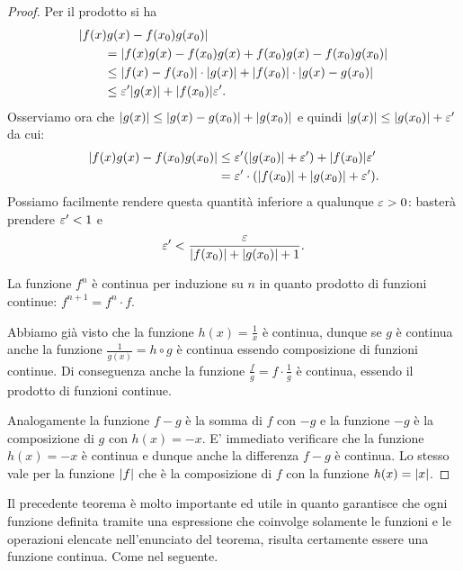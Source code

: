 \begin{proof}
  Per il prodotto si ha
  \begin{align*}
    \MoveEqLeft \abs{f(x)g(x)-f(x_0)g(x_0)}\\
    &= \abs{f(x)g(x) - f(x_0)g(x) + f(x_0)g(x) - f(x_0)g(x_0)}\\
    &\le \abs{f(x)-f(x_0)}\cdot\abs{g(x)} + \abs{f(x_0)}\cdot \abs{g(x)-g(x_0)} \\
    &\le \eps' \abs{g(x)} + \abs{f(x_0)} \eps'.
  \end{align*}
  Osserviamo ora che ${\left|g(x)\right|}\le {\left|g(x)-g(x_0)\right|} + {\left|g(x_0)\right|}$
  e quindi ${\left|g(x)\right|}\le {\left|g(x_0)\right|}+\varepsilon'$ da cui:
  \begin{align*}
    {\left|f(x)g(x)-f(x_0)g(x_0)\right|}
    &\le \varepsilon' {\left( {\left|g(x_0)\right|}+\varepsilon' \right)} + {\left|f(x_0)\right|} \varepsilon' \\
    &= \varepsilon' \cdot({\left|f(x_0)\right|} + {\left|g(x_0)\right|} + \varepsilon').
  \end{align*}
  Possiamo facilmente rendere questa quantità inferiore a
  qualunque $\varepsilon>0$: basterà prendere $\varepsilon'<1$ e
  \[
    \varepsilon' < \frac{\varepsilon}{{\left|f(x_0)\right|} + {\left|g(x_0)\right|} + 1}.
  \]
  
  La funzione $f^n$ è continua per induzione su $n$
  in quanto prodotto di funzioni
  continue: $f^{n+1} = f^{n} \cdot f$.
  
  Abbiamo già visto che la funzione $h(x) = \frac{1}{x}$ è continua,
  dunque se $g$ è continua anche la funzione $\frac{1}{g(x)} = h\circ g$
  è continua essendo composizione di funzioni continue. 
  Di conseguenza anche la funzione $\frac{f}{g} = f \cdot \frac{1}{g}$
  è continua, essendo il prodotto di funzioni continue.
  
  Analogamente la funzione $f-g$ è la somma di $f$ con $-g$ e
  la funzione $-g$ è la composizione di $g$ con $h(x)=-x$.
  E' immediato verificare che la funzione $h(x)=-x$ è continua
  e dunque anche la differenza $f-g$ è continua.
  Lo stesso vale per la funzione ${\left|f\right|}$ che è la composizione
  di $f$ con la funzione $h(x) = {\left|x\right|}$.
  \end{proof}
  
  Il precedente teorema è molto importante ed utile in quanto
  garantisce che ogni funzione definita tramite una espressione
  che coinvolge solamente le funzioni e le operazioni
  elencate nell'enunciato del teorema, risulta certamente
  essere una funzione continua. Come nel seguente.
  
